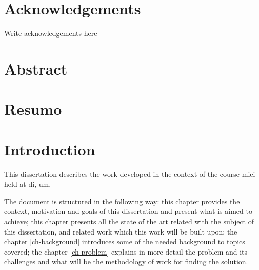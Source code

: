 \documentclass[
  oneside,
  11pt, a4paper,
  footinclude=true,
  headinclude=true,
  cleardoublepage=empty
]{scrbook}
\author{Armando João Isaías Ferreira dos Santos}
\date{\myear} %
\theoremstyle{definition}
\theoremstyle{definition}
\begin{document}
	\umfrontcover	
	\umtitlepage
	
	\chapter*{Acknowledgements}
	Write acknowledgements here


	\chapter*{Abstract}
	
	\vskip0.5cm
	
	\cleardoublepage
	\chapter*{Resumo}
	
	\vskip0.5cm
    
	\tableofcontents
	\listoffigures
	\listoftables
	\lstlistoflistings
    \renewcommand{\listtheoremname}{List of theorems and definitions}
    \listoftheorems[ignoreall,show={theorem,definition}]
	\printglossary[type=\acronymtype]
	\clearpage
	\thispagestyle{empty}

	
	
	\chapter{Introduction}
        This dissertation describes the work developed in the context of the course \gls{miei} held at \gls{di}, \gls{um}.
        
        The document is structured in the following way: this chapter provides the context, motivation and goals of this dissertation and present what is aimed to achieve; this chapter presents all the state of the art related with the subject of this dissertation, and related work which this work will be built upon; the chapter \ref{ch-background} introduces some of the needed background to topics covered; the chapter \ref{ch-problem} explains in more detail the problem and its challenges and what will be the methodology of work for finding the solution.
		
\end{document}

